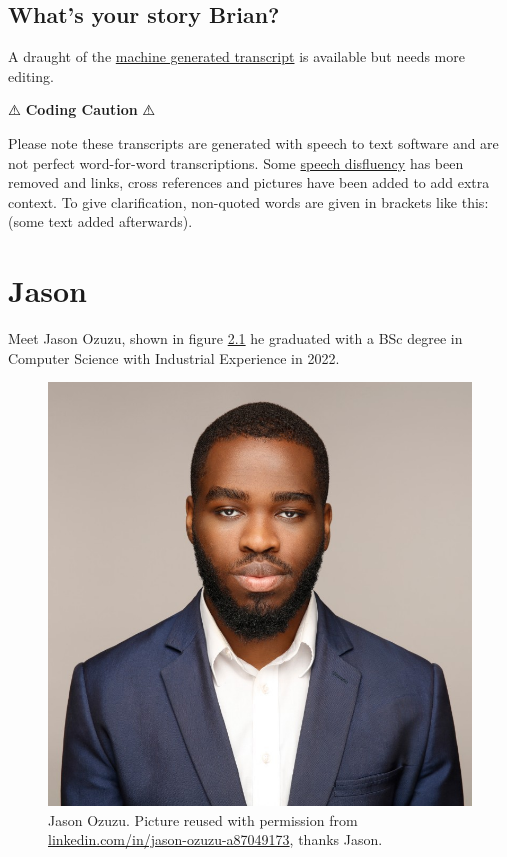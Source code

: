 \documentclass[
]{book}
\begin{document}
\hypertarget{brian-story}{%
\section{What's your story Brian?}\label{brian-story}}

A draught of the \href{https://github.com/dullhunk/cdyf/blob/master/23-brian.md}{machine generated transcript} is available but needs more editing.

⚠️ \textbf{Coding Caution} ⚠️

Please note these transcripts are generated with speech to text software and are not perfect word-for-word transcriptions. Some \href{https://en.wikipedia.org/wiki/Speech_disfluency}{speech disfluency} has been removed and links, cross references and pictures have been added to add extra context. To give clarification, non-quoted words are given in brackets like this: (some text added afterwards).

\hypertarget{jason}{%
\chapter{Jason}\label{jason}}

Meet Jason Ozuzu, shown in figure \ref{fig:jason-fig} he graduated with a BSc degree in Computer Science with Industrial Experience in 2022.

\begin{figure}

{\centering \includegraphics[width=1\linewidth]{images/jason} 

}

\caption{Jason Ozuzu. Picture reused with permission from \href{https://www.linkedin.com/in/jason-ozuzu-a87049173/}{linkedin.com/in/jason-ozuzu-a87049173}, thanks Jason.}\label{fig:jason-fig}
\end{figure}
\end{document}
